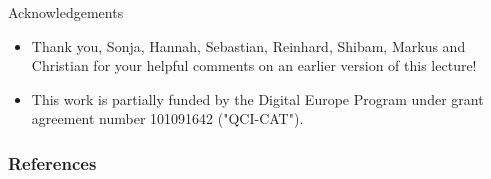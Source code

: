 \documentclass[10pt]{beamer}
\begin{document}
    \begin{frame}{Acknowledgements}
      \begin{itemize}
        \item Thank you, Sonja, Hannah, Sebastian, Reinhard, Shibam, Markus and Christian
for your helpful comments on an earlier version of this lecture!
        \item       This work is partially funded by the Digital Europe Program under grant
agreement number 101091642 ("QCI-CAT"). 
      \end{itemize}
    \end{frame}
\maketitle
    \begin{frame}[allowframebreaks]
      \frametitle{References}

      
      

    \end{frame}
    
\end{document}

